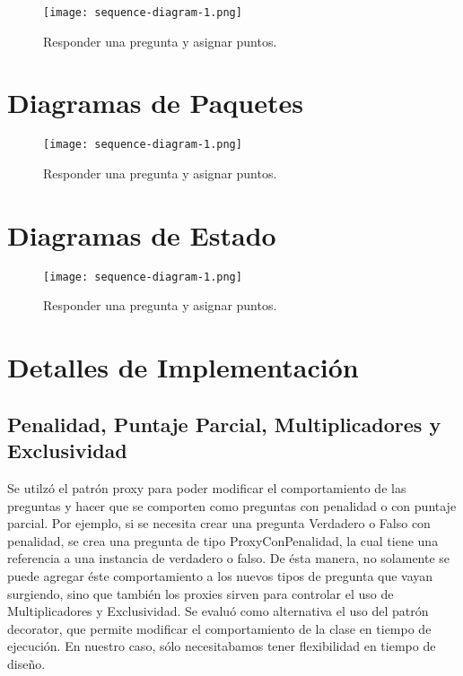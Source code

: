 \documentclass[titlepage,a4paper]{article}
\begin{document}
\begin{figure}[H]
\centering
\texttt{[image: sequence-diagram-1.png]}
\caption{\label{fig:seq01}Responder una pregunta y asignar puntos.}
\end{figure}


\section{Diagramas de Paquetes}\label{sec:diagramasdepaquetes}

\begin{figure}[H]
\centering
\texttt{[image: sequence-diagram-1.png]}
\caption{\label{fig:seq01}Responder una pregunta y asignar puntos.}
\end{figure}


\section{Diagramas de Estado}\label{sec:diagramasdeestado}

\begin{figure}[H]
\centering
\texttt{[image: sequence-diagram-1.png]}
\caption{\label{fig:seq01}Responder una pregunta y asignar puntos.}
\end{figure}


\section{Detalles de Implementación}\label{sec:detallesdeimplementacion}

\subsection{Penalidad, Puntaje Parcial, Multiplicadores y Exclusividad} Se utilzó el patrón proxy para poder modificar el comportamiento de las preguntas y hacer que se comporten como preguntas con penalidad o con puntaje parcial. Por ejemplo, si se necesita crear una pregunta Verdadero o Falso con penalidad, se crea una pregunta de tipo ProxyConPenalidad, la cual tiene una referencia a una instancia de verdadero o falso. De
ésta manera, no solamente se puede agregar éste comportamiento a los nuevos tipos de pregunta que vayan surgiendo, sino que también los proxies sirven para controlar el uso de Multiplicadores y Exclusividad. Se evaluó como alternativa el uso del patrón decorator, que permite modificar el comportamiento de la clase en tiempo de ejecución. En nuestro caso, sólo necesitabamos tener flexibilidad en tiempo de diseño.
\end{document}
